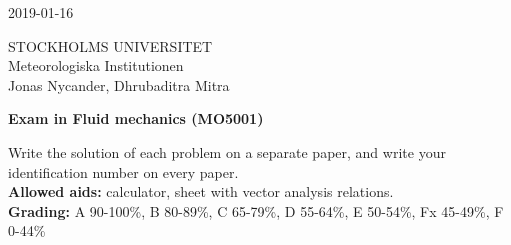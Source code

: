 \documentclass[12pt,a4paper]{article}
\begin{document}
\begin{center}
2019-01-16
\end{center}
STOCKHOLMS UNIVERSITET\\
Meteorologiska Institutionen\\
Jonas Nycander, Dhrubaditra Mitra\\
\vspace{1cm}

\begin{center}
{\bf\large Exam in Fluid mechanics (MO5001)}\\
\end{center}

Write the solution of each problem on a separate paper, and write your identification number on every paper.\\

{\bf Allowed aids:} calculator, sheet with vector analysis relations.\\

{\bf Grading:} A 90-100\%, B 80-89\%, C 65-79\%, D 55-64\%, E 50-54\%, Fx 45-49\%, F 0-44\% \\
\vspace{0.5cm}
\end{document}
